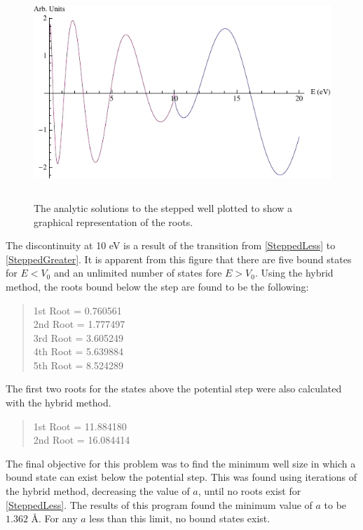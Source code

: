 \documentclass[12pt]{article}
\begin{document}
\begin{figure}[!h]
\centering
\includegraphics[width =150 mm, height = 80mm]{SteppedWell.pdf}
\caption{The analytic solutions to the stepped well plotted to show a graphical representation of the roots.}
\label{fig:FiniteWellDiagram}
\end{figure}
The discontinuity at 10 eV is a result of the transition from \eqref{SteppedLess} to \eqref{SteppedGreater}.  It is apparent from this figure that there are five bound states for $E < V_0$ and an unlimited number of states fore $E > V_0$.  Using the hybrid method, the roots bound below the step are found to be the following:
\begin{quote}
\begin{center}
1st Root = 0.760561\\
2nd Root = 1.777497\\
3rd Root = 3.605249\\
4th Root = 5.639884\\
5th Root = 8.524289\\
\end{center}
\end{quote}
The first two roots for the states above the potential step were also calculated with the hybrid method.
\begin{quote}
\begin{center}
1st Root = 11.884180\\
2nd Root = 16.084414\\
\end{center}
\end{quote}
The final objective for this problem was to find the minimum well size in which a bound state can exist below the potential step.  This was found using iterations of the hybrid method, decreasing the value of $a$, until no roots exist for \eqref{SteppedLess}.  The results of this program found the minimum value of $a$ to be $1.362$ \AA.  For any $a$ less than this limit, no bound states exist.
\end{document}
